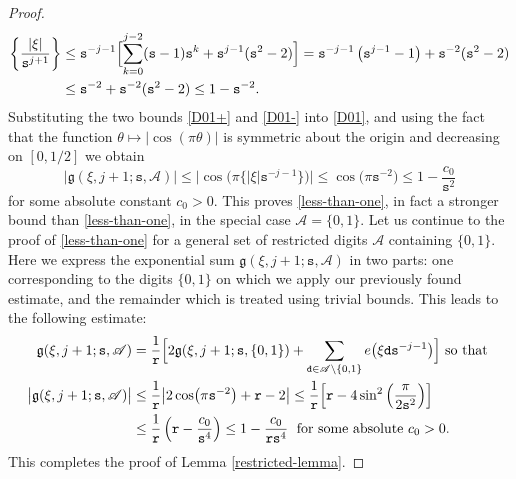 \documentclass[12pt, twoside]{article}
\theoremstyle{definition}
\numberwithin{equation}{section}
\begin{document}
\begin{proof}
\begin{align}
\left\{\frac{|\xi|}{\mathtt s^{j+1}}\right\} & 
\leq  \mathtt s^{-j-1} \Bigl[ \sum_{k=0}^{j-2}  (\mathtt s-1) \mathtt s^k + \mathtt s^{j-1}(\mathtt s^2-2)  \Bigr]  = \mathtt s^{-j-1} \left({\mathtt s^{j-1}-1}\right) + \mathtt s^{-2}(\mathtt s^2-2)  \nonumber \\ &\leq \mathtt s^{-2} + \mathtt s^{-2}(\mathtt s^2-2)  \leq 1 - \mathtt s^{-2}. \label{D01-}
 \end{align}
Substituting the two bounds \eqref{D01+} and \eqref{D01-} into \eqref{D01}, and using the fact that the function $\theta \mapsto |\cos(\pi \theta)|$ is symmetric about the origin and decreasing on $[0, 1/2]$ we obtain 
\begin{equation} \label{g-nontrivial-bound}
|\mathfrak g(\xi, j+1; \mathtt s, \mathscr{A})| \leq \bigl|\cos \bigl({\pi \bigl\{|\xi|}{\mathtt s^{-j-1}} \bigr\}\bigr) \bigr| \leq \cos \bigl(\pi \mathtt s^{-2} \bigr) \leq 1 - \frac{c_0}{\mathtt s^2}
\end{equation}    
for some absolute constant $c_0 > 0$. This proves \eqref{less-than-one}, in fact a stronger bound than \eqref{less-than-one}, in the special case $\mathscr{A} = \{0,1\}$.  
\vskip0.1in
\noindent Let us continue to the proof of \eqref{less-than-one} for a general set of restricted digits $\mathscr{A}$ containing $\{0,1\}$. Here we express the exponential sum $ \mathfrak g(\xi, j+1; \mathtt s, \mathscr{A})$ in two parts: one corresponding to the digits $\{0, 1\}$ on which we apply our previously found estimate, and the remainder which is treated using trivial bounds. This leads to the following estimate: 
\begin{align*} \mathfrak g(\xi, j+1; \mathtt s, \mathscr{A}) &= \frac{1}{\mathtt r} \Bigl[ 2 \mathfrak g(\xi, j+1; \mathtt s, \{0, 1\}) + \sum_{\mathtt d \in \mathscr{A} \setminus \{0, 1\}} e \bigl(\xi \mathtt d \mathtt s^{-j-1}\bigr) \Bigr]  \text{ so that } \\ 
\bigl| \mathfrak g(\xi, j+1; \mathtt s, \mathscr{A}) \bigr| &\leq \frac{1}{\mathtt r} \bigl| 2 \cos \bigl( \pi \mathtt s^{-2} \bigr) + \mathtt r - 2 \bigr| \leq \frac{1}{\mathtt r} \Bigl[\mathtt r - 4 \sin^2 \left(\frac{\pi}{2\mathtt s^2}\right)\Bigr] \\ &\leq \frac{1}{\mathtt r} \left(\mathtt r - \frac{c_0}{\mathtt s^4}\right) \leq 1 - \frac{c_0}{\mathtt r \mathtt s^4} \; \text{ for some absolute } c_0 > 0. 
\end{align*} 
This completes the proof of Lemma \ref{restricted-lemma}.  
\end{proof} 
\end{document}
